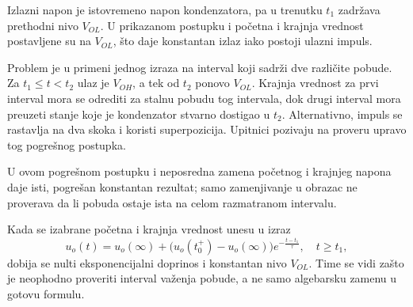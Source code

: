Izlazni napon je istovremeno napon kondenzatora, pa u trenutku $t_1$ zadržava prethodni nivo $V_{OL}$. U prikazanom postupku i početna i krajnja vrednost postavljene su na $V_{OL}$, što daje konstantan izlaz iako postoji ulazni impuls.

Problem je u primeni jednog izraza na interval koji sadrži dve različite pobude. Za $t_1\leq t<t_2$ ulaz je $V_{OH}$, a tek od $t_2$ ponovo $V_{OL}$. Krajnja vrednost za prvi interval mora se odrediti za stalnu pobudu tog intervala, dok drugi interval mora preuzeti stanje koje je kondenzator stvarno dostigao u $t_2$. Alternativno, impuls se rastavlja na dva skoka i koristi superpozicija. Upitnici pozivaju na proveru upravo tog pogrešnog postupka.

U ovom pogrešnom postupku i neposredna zamena početnog i krajnjeg napona daje isti, pogrešan konstantan rezultat; samo zamenjivanje u obrazac ne proverava da li pobuda ostaje ista na celom razmatranom intervalu.

Kada se izabrane početna i krajnja vrednost unesu u izraz
\[u_o(t)=u_o(\infty)+\bigl(u_o(t_0^+)-u_o(\infty)\bigr)e^{-\frac{t-t_1}{\tau}},\quad t\geq t_1,\]
dobija se nulti eksponencijalni doprinos i konstantan nivo $V_{OL}$. Time se vidi zašto je neophodno proveriti interval važenja pobude, a ne samo algebarsku zamenu u gotovu formulu.
